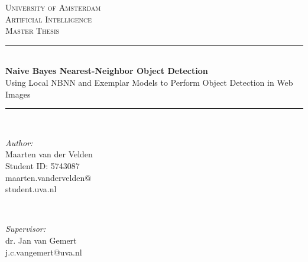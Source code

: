 \documentclass[a4paper,10pt]{article}
\begin{document}
\begin{titlepage}

\newcommand{\HRule}{\rule{\linewidth}{0.5mm}} %
\center %
 

\textsc{\LARGE University of Amsterdam}\\[1.0cm] %
\textsc{\Large Artificial Intelligence}\\[0.5cm] %
\textsc{\large Master Thesis}\\[0.5cm] %


\HRule \\[0.4cm]
{ \huge \bfseries Naive Bayes Nearest-Neighbor Object Detection}\\[0.1cm]
{ \large Using Local NBNN and Exemplar Models to Perform Object Detection in Web Images}\\[0.2cm]
\HRule \\[1.5cm]
 

\begin{minipage}{0.4\textwidth}
\begin{flushleft} \large
\emph{Author:}\\
Maarten van der Velden\\
Student ID: 5743087\\
maarten.vandervelden@\\student.uva.nl
\end{flushleft}
\end{minipage}
~
\begin{minipage}{0.4\textwidth}
\begin{flushright} \large
\emph{Supervisor:} \\
dr. Jan van Gemert\\
j.c.vangemert@uva.nl
\end{flushright}
\end{minipage}\\[2cm]


\end{titlepage}
\end{document}
